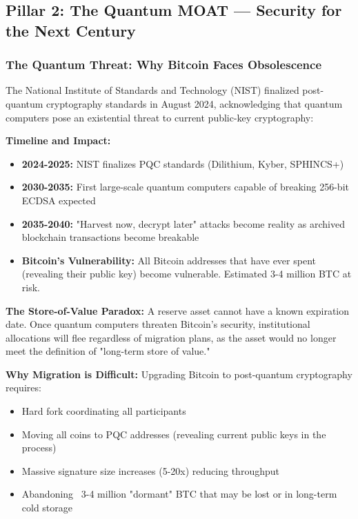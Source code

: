 \documentclass[11pt,a4paper]{article}
\begin{document}
\subsection{Pillar 2: The Quantum MOAT — Security for the Next Century}

\subsubsection{The Quantum Threat: Why Bitcoin Faces Obsolescence}

The National Institute of Standards and Technology (NIST) finalized post-quantum cryptography standards in August 2024, acknowledging that quantum computers pose an existential threat to current public-key cryptography:

\textbf{Timeline and Impact:}
\begin{itemize}[leftmargin=*]
\item \textbf{2024-2025:} NIST finalizes PQC standards (Dilithium, Kyber, SPHINCS+)
\item \textbf{2030-2035:} First large-scale quantum computers capable of breaking 256-bit ECDSA expected
\item \textbf{2035-2040:} "Harvest now, decrypt later" attacks become reality as archived blockchain transactions become breakable
\item \textbf{Bitcoin's Vulnerability:} All Bitcoin addresses that have ever spent (revealing their public key) become vulnerable. Estimated 3-4 million BTC at risk.
\end{itemize}

\textbf{The Store-of-Value Paradox:} A reserve asset cannot have a known expiration date. Once quantum computers threaten Bitcoin's security, institutional allocations will flee regardless of migration plans, as the asset would no longer meet the definition of "long-term store of value."

\textbf{Why Migration is Difficult:} Upgrading Bitcoin to post-quantum cryptography requires:
\begin{itemize}[leftmargin=*]
\item Hard fork coordinating all participants
\item Moving all coins to PQC addresses (revealing current public keys in the process)
\item Massive signature size increases (5-20x) reducing throughput
\item Abandoning ~3-4 million "dormant" BTC that may be lost or in long-term cold storage
\end{itemize}
\end{document}
